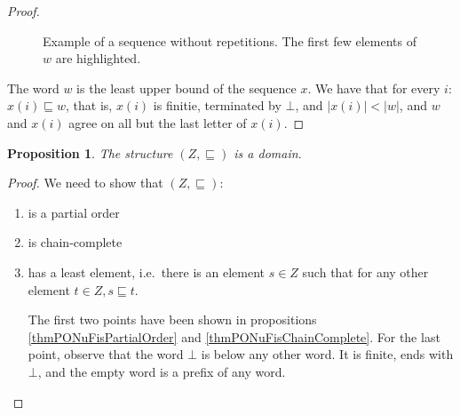 \documentclass[a4paper]{article}
\newtheorem{thmPONuFisADomain}[defNuF]{Proposition}
\begin{document}
\begin{proof}
\begin{figure}
\begin{center}
\end{center}
\caption{Example of a sequence without repetitions. The first few elements of
$w$ are highlighted.}
\label{figExampleXprime}
\end{figure}

The word $w$ is the least upper bound of the sequence $x$. We have that for
every $i$: $x(i) \sqsubseteq w$, that is, $x(i)$ is finitie, terminated by
$\bot$, and $|x(i)| < |w|$, and $w$ and $x(i)$ agree on all but the last letter
of $x(i)$.

\end{proof}


\begin{thmPONuFisADomain}

The structure $(Z, \sqsubseteq)$ is a domain.

\end{thmPONuFisADomain}

\begin{proof}

We need to show that $(Z, \sqsubseteq)$:

\begin{enumerate}

  \item is a partial order

  \item is chain-complete

  \item has a least element, i.e.~there is an element $s \in Z$ such that for
    any other element $t \in Z, s \sqsubseteq t$.

The first two points have been shown in propositions
\ref{thmPONuFisPartialOrder} and \ref{thmPONuFisChainComplete}.  For the last
point, observe that the word $\bot$ is below any other word.  It is finite, ends
with $\bot$, and the empty word is a prefix of any word.

\end{enumerate}

\end{proof}
\end{document}
